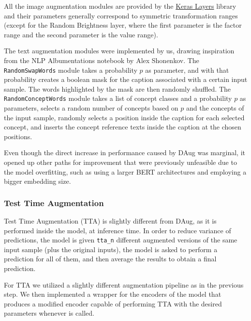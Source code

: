 \documentclass[10pt,twocolumn,letterpaper]{article}
\begin{document}
All the image augmentation modules are provided by the \href{https://www.tensorflow.org/api_docs/python/tf/keras/layers/}{Keras Layers} library and their parameters generally correspond to symmetric transformation ranges (except for the Random Brightness layer, where the first parameter is the factor range and the second parameter is the value range).

The text augmentation modules were implemented by us, drawing inspiration from the NLP Albumentations notebook by Alex Shonenkov\cite{nlp_alb}.
The \texttt{RandomSwapWords} module takes a probability $p$ as parameter, and with that probability creates a boolean mask for the caption associated with a certain input sample. The words highlighted by the mask are then randomly shuffled.
The \texttt{RandomConceptWords} module takes a list of concept classes and a probability $p$ as parameters, selects a random number of concepts based on $p$ and the concepts of the input sample, randomly selects a position inside the caption for each selected concept, and inserts the concept reference texts inside the caption at the chosen positions.

Even though the direct increase in performance caused by DAug was marginal, it opened up other paths for improvement that were previously unfeasible due to the model overfitting, such as using a larger BERT architectures and employing a bigger embedding size.

\subsubsection{Test Time Augmentation}
Test Time Augmentation (TTA) is slightly different from DAug, as it is performed inside the model, at inference time.
In order to reduce variance of predictions, the model is given \texttt{tta\_n} different augmented versions of the same input sample (plus the original inputs), the model is asked to perform a prediction for all of them, and then average the results to obtain a final prediction.

For TTA we utilized a slightly different augmentation pipeline as in the previous step.
We then implemented a wrapper for the encoders of the model that produces a modified encoder capable of performing TTA with the desired parameters whenever is called.
\end{document}
